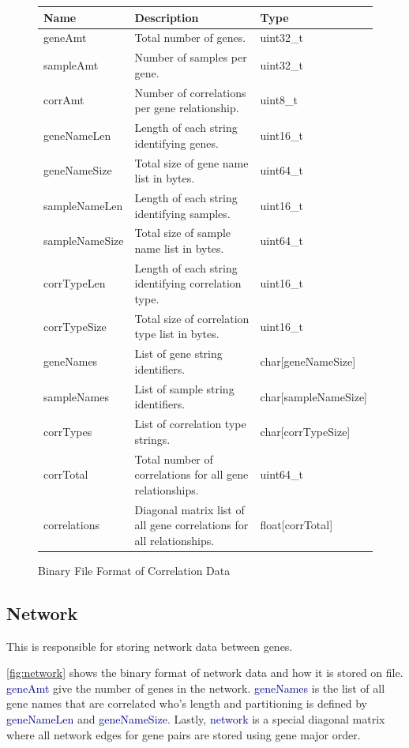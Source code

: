 \documentclass[10pt]{article}
\providecommand{\h}[1]{\textcolor{darkblue}{#1}}
\begin{document}
\begin{figure}[H]
\begin{mdframed}[style=btable]
\begin{tabularx}{\textwidth}{|l|X|l|}
\hline
\textbf{Name} & \textbf{Description} & \textbf{Type} \\
\hline
geneAmt & Total number of genes. & uint32\_t \\
\hline
sampleAmt & Number of samples per gene. & uint32\_t \\
\hline
corrAmt & Number of correlations per gene relationship. & uint8\_t \\
\hline
geneNameLen & Length of each string identifying genes. & uint16\_t \\
\hline
geneNameSize & Total size of gene name list in bytes. & uint64\_t \\
\hline
sampleNameLen & Length of each string identifying samples. & uint16\_t \\
\hline
sampleNameSize & Total size of sample name list in bytes. & uint64\_t \\
\hline
corrTypeLen & Length of each string identifying correlation type. & uint16\_t \\
\hline
corrTypeSize & Total size of correlation type list in bytes. & uint16\_t \\
\hline
geneNames & List of gene string identifiers. & char[geneNameSize] \\
\hline
sampleNames & List of sample string identifiers. & char[sampleNameSize] \\
\hline
corrTypes & List of correlation type strings. & char[corrTypeSize] \\
\hline
corrTotal & Total number of correlations for all gene relationships. & 
uint64\_t \\
\hline
correlations & Diagonal matrix list of all gene correlations for all 
relationships. & float[corrTotal] \\
\hline
\end{tabularx}
\end{mdframed}
\caption{Binary File Format of Correlation Data}
\label{fig:correlation}
\end{figure}

\subsection{Network}

This is responsible for storing network data between genes.

\autoref{fig:network} shows the binary format of network data and how it is 
stored on file. \h{geneAmt} give the number of genes in the network. 
\h{geneNames} is the list of all gene names that are correlated who's length 
and 
partitioning is defined by \h{geneNameLen} and \h{geneNameSize}. Lastly, 
\h{network} is a special diagonal matrix where all network edges for gene pairs 
are stored using gene major order.
\end{document}
